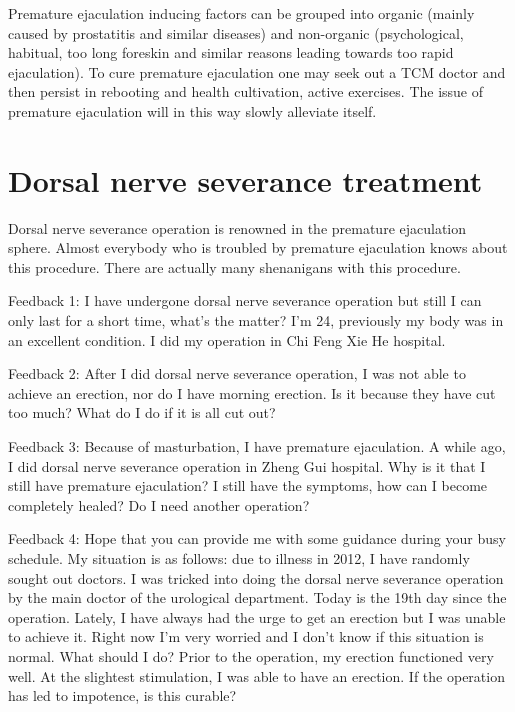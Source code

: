 \documentclass[
]{book}
\begin{document}
Premature ejaculation inducing factors can be grouped into organic (mainly caused by prostatitis and similar diseases) and non-organic (psychological, habitual, too long foreskin and similar reasons leading towards too rapid ejaculation). To cure premature ejaculation one may seek out a TCM doctor and then persist in rebooting and health cultivation, active exercises. The issue of premature ejaculation will in this way slowly alleviate itself.

\hypertarget{dorsal-nerve-severance-treatment}{%
\section{Dorsal nerve severance treatment}\label{dorsal-nerve-severance-treatment}}

Dorsal nerve severance operation is renowned in the premature ejaculation sphere. Almost everybody who is troubled by premature ejaculation knows about this procedure. There are actually many shenanigans with this procedure.

Feedback 1: I have undergone dorsal nerve severance operation but still I can only last for a short time, what's the matter? I'm 24, previously my body was in an excellent condition. I did my operation in Chi Feng Xie He hospital.

Feedback 2: After I did dorsal nerve severance operation, I was not able to achieve an erection, nor do I have morning erection. Is it because they have cut too much? What do I do if it is all cut out?

Feedback 3: Because of masturbation, I have premature ejaculation. A while ago, I did dorsal nerve severance operation in Zheng Gui hospital. Why is it that I still have premature ejaculation? I still have the symptoms, how can I become completely healed? Do I need another operation?

Feedback 4: Hope that you can provide me with some guidance during your busy schedule. My situation is as follows: due to illness in 2012, I have randomly sought out doctors. I was tricked into doing the dorsal nerve severance operation by the main doctor of the urological department. Today is the 19th day since the operation. Lately, I have always had the urge to get an erection but I was unable to achieve it. Right now I'm very worried and I don't know if this situation is normal. What should I do? Prior to the operation, my erection functioned very well. At the slightest stimulation, I was able to have an erection. If the operation has led to impotence, is this curable?
\end{document}
